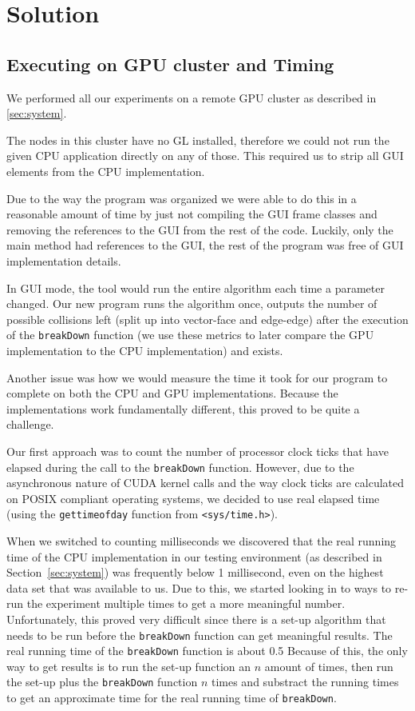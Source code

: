 \section{Solution}
\subsection{Executing on GPU cluster and Timing}
We performed all our experiments on a remote GPU cluster as described in \ref{sec:system}.

The nodes in this cluster have no GL installed, therefore we could not run the given CPU application directly on any of those.
This required us to strip all GUI elements from the CPU implementation.

Due to the way the program was organized we were able to do this in a reasonable amount of time by just not compiling the GUI frame classes and removing the references to the GUI from the rest of the code.
Luckily, only the main method had references to the GUI, the rest of the program was free of GUI implementation details.

In GUI mode, the tool would run the entire algorithm each time a parameter changed.
Our new program runs the algorithm once, outputs the number of possible collisions left (split up into vector-face and edge-edge) after the execution of the \texttt{breakDown} function (we use these metrics to later compare the GPU implementation to the CPU implementation) and exists.

Another issue was how we would measure the time it took for our program to complete on both the CPU and GPU implementations.
Because the implementations work fundamentally different, this proved to be quite a challenge.

Our first approach was to count the number of processor clock ticks that have elapsed during the call to the \texttt{breakDown} function.
However, due to the asynchronous nature of CUDA kernel calls and the way clock ticks are calculated on POSIX compliant operating systems, we decided to use real elapsed time (using the \texttt{gettimeofday} function from \texttt{<sys/time.h>}).

When we switched to counting milliseconds we discovered that the real running time of the CPU implementation in our testing environment (as described in Section~\ref{sec:system}) was frequently below 1 millisecond, even on the highest data set that was available to us.
Due to this, we started looking in to ways to re-run the experiment multiple times to get a more meaningful number.
Unfortunately, this proved very difficult since there is a set-up algorithm that needs to be run before the \texttt{breakDown} function can get meaningful results.
The real running time of the \texttt{breakDown} function is about 0.5%
Because of this, the only way to get results is to run the set-up function an $n$ amount of times, then run the set-up plus the \texttt{breakDown} function $n$ times and substract the running times to get an approximate time for the real running time of \texttt{breakDown}.

